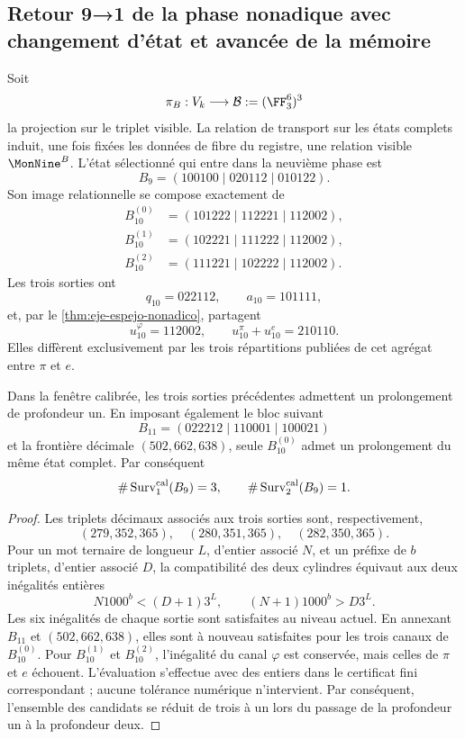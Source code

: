 \subsection{Retour 9→1 de la phase nonadique avec changement d'état et avancée de la mémoire}

Soit
\[
 \pi_B:V_k\longrightarrow\mathcal B:=(\FF_3^6)^3
\]
la projection sur le triplet visible. La relation de transport sur les états
complets induit, une fois fixées les données de fibre du registre, une relation
visible \(\MonNine^B\). L'état sélectionné qui entre dans la neuvième phase est
\[
B_9=(100100\mid020112\mid010122).
\]
Son image relationnelle se compose exactement de
\[
\begin{aligned}
B_{10}^{(0)}&=(101222\mid112221\mid112002),\\
B_{10}^{(1)}&=(102221\mid111222\mid112002),\\
B_{10}^{(2)}&=(111221\mid102222\mid112002).
\end{aligned}
\]
Les trois sorties ont
\[
q_{10}=022112,
\qquad a_{10}=101111,
\]
et, par le \cref{thm:eje-espejo-nonadico}, partagent
\[
u_{10}^\varphi=112002,
\qquad u_{10}^\pi+u_{10}^e=210110.
\]
Elles diffèrent exclusivement par les trois répartitions publiées de cet agrégat
entre \(\pi\) et \(e\).

\begin{theorem}
\label{thm:seleccion-novena-fase}
Dans la fenêtre calibrée, les trois sorties précédentes admettent un prolongement
de profondeur un. En imposant également le bloc suivant
\[
B_{11}=(022212\mid110001\mid100021)
\]
et la frontière décimale \((502,662,638)\), seule
\(B_{10}^{(0)}\) admet un prolongement du même état complet. Par conséquent
\[
\#\operatorname{Surv}^{\rm cal}_{1}(B_9)=3,
\qquad
\#\operatorname{Surv}^{\rm cal}_{2}(B_9)=1.
\]
\end{theorem}

\begin{proof}
Les triplets décimaux associés aux trois sorties sont, respectivement,
\[
(279,352,365),\quad(280,351,365),\quad(282,350,365).
\]
Pour un mot ternaire de longueur \(L\), d'entier associé \(N\), et un
préfixe de \(b\) triplets, d'entier associé \(D\), la compatibilité des
deux cylindres équivaut aux deux inégalités entières
\[
N1000^b<(D+1)3^L,
\qquad
(N+1)1000^b>D3^L.
\]
Les six inégalités de chaque sortie sont satisfaites au niveau actuel. En
annexant \(B_{11}\) et \((502,662,638)\), elles sont à nouveau satisfaites pour les trois
canaux de \(B_{10}^{(0)}\). Pour \(B_{10}^{(1)}\) et \(B_{10}^{(2)}\),
l'inégalité du canal \(\varphi\) est conservée, mais celles de \(\pi\) et
\(e\) échouent. L'évaluation s'effectue avec des entiers dans le certificat fini correspondant ; aucune
tolérance numérique n'intervient. Par conséquent, l'ensemble des candidats
se réduit de trois à un lors du passage de la profondeur un à la profondeur deux.
\end{proof}

